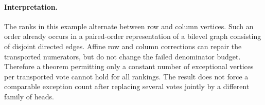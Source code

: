 \documentclass[11pt]{article}
\begin{document}
\paragraph{Interpretation.}
The ranks in this example alternate between row and column vertices.
Such an order already occurs in a paired-order representation of a
bilevel graph consisting of disjoint directed edges. Affine row and
column corrections can repair the transported numerators, but do not
change the failed denominator budget. Therefore a theorem permitting
only a constant number of exceptional vertices per transported vote
cannot hold for all rankings. The result does not force a comparable
exception count after replacing several votes jointly by a different
family of heads.
\end{document}
